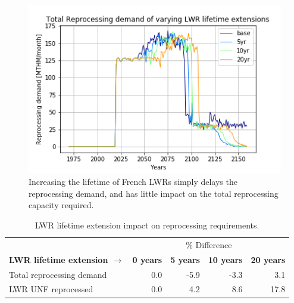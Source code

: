 \begin{figure}[htbp!]
    \begin{center}
        \includegraphics[scale=0.7]{./images/sensitivity/ext_tot_rep.png}
    \end{center}
    \caption{Increasing the lifetime of French \glspl{LWR} simply delays the
             reprocessing demand, and has little impact on the total 
     reprocessing capacity required.}
    \label{fig:ext_all}
\end{figure}

\begin{table}[h]
	\centering
        \caption{\gls{LWR} lifetime extension impact on reprocessing 
        requirements.}
	\begin{tabular}{lrrrr}
		\hline
		  & \multicolumn{4}{c}{\% Difference} \\
		 \textbf{LWR lifetime extension $\longrightarrow$}& \textbf{0 years}& \textbf{5 years} & \textbf{10 years} & \textbf{20 years} \\
		\hline
		Total reprocessing demand & 0.0 & -5.9 & -3.3 & 3.1 \\
		\gls{LWR} \gls{UNF} reprocessed & 0.0  & 4.2 & 8.6 & 17.8 \\
		\hline
	\end{tabular}
	\label{tab:ext_diff}
\end{table}

